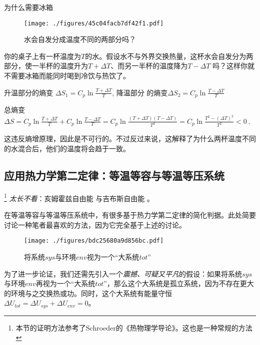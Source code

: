 \begin{example}{为什么需要冰箱}
\begin{figure}[ht]
\centering
\texttt{[image: ./figures/45c04facb7df42f1.pdf]}
\caption{水会自发分成温度不同的两部分吗？} \label{fig_Td2Law_5}
\end{figure}
你的桌子上有一杯温度为$T$的水。假设水不与外界交换热量，这杯水会自发分为两部分，使一半杯的温度升为$T+\Delta T$、而另一半杯的温度降为$T-\Delta T$ 吗？这样你就不需要冰箱而能同时喝到冷饮与热饮了。

升温部分的熵变 $\Delta S_1=C_p \ln \frac{T+\Delta T}{T}$, 降温部分 的熵变$\Delta S_2=C_p \ln \frac{T-\Delta T}{T}$

总熵变 $\Delta S = C_p \ln \frac{T+\Delta T}{T} + C_p \ln \frac{T-\Delta T}{T} = C_p \ln \frac{(T+\Delta T)(T-\Delta T)}{T^2}= C_p \ln \frac{T^2 - (\Delta T)^2}{T^2}<0~.$

这违反熵增原理，因此是不可行的。不过反过来说，这解释了为什么两杯温度不同的水混合后，他们的温度将会趋于一致。

\end{example}

\subsection{应用热力学第二定律：等温等容与等温等压系统}
\footnote{本节的证明方法参考了Schroeder的《热物理学导论》。这也是一种常规的方法} 
\textsl{太长不看}：亥姆霍兹自由能 与吉布斯自由能 。

在等温等容与等温等压系统中，有很多基于热力学第二定律的简化判据。此处简要讨论一种笔者最喜欢的方法，因为它完全基于上述的讨论。

\begin{figure}[ht]
\centering
\texttt{[image: ./figures/bdc25680a9d856bc.pdf]}
\caption{将系统$sys$与环境$env$视为一个“大系统$tot$”} \label{fig_Td2Law_3}
\end{figure}

为了进一步论证，我们还需先引入一个\textsl{震撼、可疑又平凡}的假设：如果将系统$sys$与环境$env$再视为一个“大系统$tot$”，那么这个大系统是孤立系统，因为不存在更大的环境与之交换热或功。同时，这个大系统有能量守恒 $\Delta U_{tot} = \Delta U_{sys} + \Delta U_{env} = 0$。

